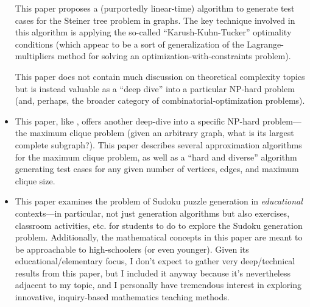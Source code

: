 \documentclass{extarticle}
\begin{document}
\begin{itemize}
\begin{annotation}
      This paper proposes a (purportedly linear-time) algorithm to generate
      test cases for the Steiner tree problem in graphs.  The key technique
      involved in this algorithm is applying the so-called
      ``Karush-Kuhn-Tucker'' optimality conditions (which appear to be a sort
      of generalization of the Lagrange-multipliers method for solving an
      optimization-with-constraints problem).

      This paper does not contain much discussion on theoretical complexity
      topics but is instead valuable as a ``deep dive'' into a particular
      NP-hard problem (and, perhaps, the broader category of
      combinatorial-optimization problems).
    \end{annotation}

  \item {}

    \begin{annotation}
      This paper, like \textcite{hard-diverse-graph-tests}, offers another
      deep-dive into a specific NP-hard problem---the maximum clique problem
      (given an arbitrary graph, what is its largest complete subgraph?).  This
      paper describes several approximation algorithms for the maximum clique
      problem, as well as a ``hard and diverse'' algorithm generating test
      cases for any given number of vertices, edges, and maximum clique size.
    \end{annotation}

  \item {}

    \begin{annotation}
      This paper examines the problem of Sudoku puzzle generation in
      \emph{educational} contexts---in particular, not just generation
      algorithms but also exercises, classroom activities, etc. for students to
      do to explore the Sudoku generation problem.  Additionally, the
      mathematical concepts in this paper are meant to be approachable to
      high-schoolers (or even younger).  Given its educational/elementary
      focus, I don't expect to gather very deep/technical results from this
      paper, but I included it anyway because it's nevertheless adjacent to my
      topic, and I personally have tremendous interest in exploring innovative,
      inquiry-based mathematics teaching methods.
    \end{annotation}

\end{itemize}
\end{document}
